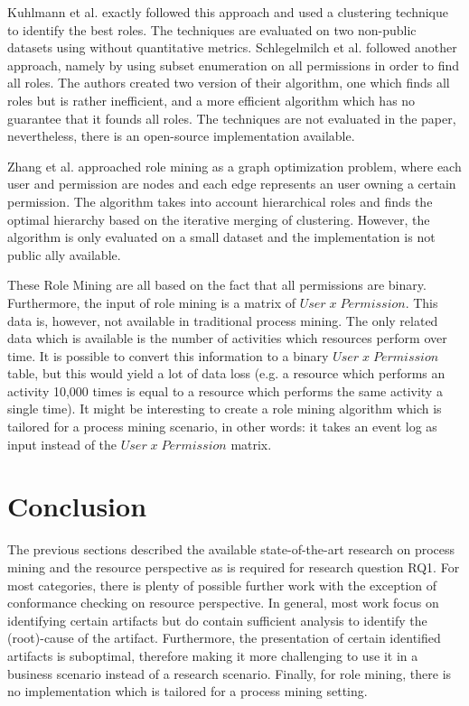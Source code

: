 Kuhlmann et al. \cite{kuhlmann2003role} exactly followed this approach and used a clustering technique to identify the best roles. The techniques are evaluated on two non-public datasets using without quantitative metrics. Schlegelmilch et al. \cite{Schlegelmilch2005} followed another approach, namely by using subset enumeration on all permissions in order to find  all roles. The authors created two version of their algorithm, one which finds all roles but is rather inefficient, and a more efficient algorithm which has no guarantee that it founds all roles. The techniques are not evaluated in the paper, nevertheless, there is an open-source implementation available.

Zhang et al. \cite{zhang2007role} approached role mining as a graph optimization problem, where each user and permission are nodes and each edge represents an user owning a certain permission. The algorithm takes into account hierarchical roles and finds the optimal hierarchy based on the iterative merging of clustering. However, the algorithm is only evaluated on a small dataset and the implementation is not public ally available. 

These Role Mining are all based on the fact that all permissions are binary. Furthermore, the input of role mining is a matrix of $User \; x \; Permission$. This data is, however, not available in traditional process mining. The only related data which is available is the number of activities which resources perform over time. It is possible to convert this information to a binary $User \; x \; Permission$ table, but this would yield a lot of data loss (e.g. a resource which performs an activity 10,000 times is equal to a resource which performs the same activity a single time). It might be interesting to create a role mining algorithm which is tailored for a process mining scenario, in other words: it takes an event log as input instead of the $User \; x \; Permission$ matrix. 

\section{Conclusion}
The previous sections described the available state-of-the-art research on process mining and the resource perspective as is required for research question RQ1. For most categories, there is plenty of possible further work with the exception of conformance checking on resource perspective. In general, most work focus on identifying certain artifacts but do contain sufficient analysis to identify the (root)-cause of the artifact. Furthermore, the presentation of certain identified artifacts is suboptimal, therefore making it more challenging to use it in a business scenario instead of a research scenario. Finally, for role mining, there is no implementation which is tailored for a process mining setting.

